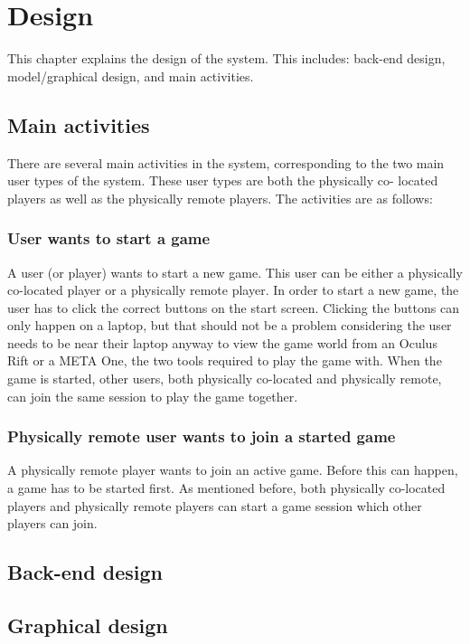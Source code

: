 \chapter{Design} \label{cha:design}
	This chapter explains the design of the system. This includes: back-end
	design, model/graphical design, and main activities.

	\section{Main activities} \label{sec:mainactivities}
		There are several main activities in the system, corresponding to the two
		main user types of the system. These user types are both the physically co-
		located	players as well as the physically remote players. The activities
		are as follows:

		\subsection{User wants to start a game} \label{ssec:userstartgame}
			A user (or player) wants to start a new game. This user can be either
			a physically co-located player or a physically remote player. In
			order to start a new game, the user has to click the correct buttons
			on the start screen. Clicking the buttons can only happen on a laptop,
			but that should not be a problem considering the user needs to be near
			their laptop anyway to view the game world from an Oculus Rift or a
			META One, the two tools required to play the game with. When the game
			is started, other users, both physically co-located and physically
			remote, can join the same session to play the game together.

		\subsection{Physically remote user wants to join a started game}
				\label{ssec:remotejoingame}
			A physically remote player wants to join an active game. Before
			this can happen, a game has to be started first. As mentioned
			before, both physically co-located players and physically remote
			players can start a game session which other players can join.

	\section{Back-end design} \label{sec:backenddesign}


	\section{Graphical design} \label{sec:graphicaldesign}
